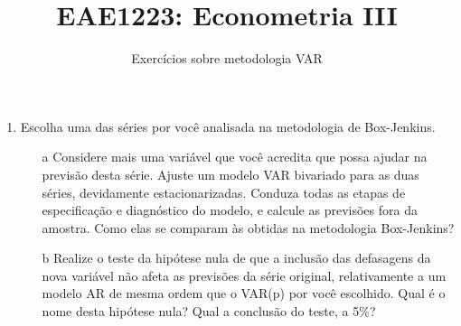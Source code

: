 \documentclass[10pt,a4paper]{article}
\title{\large EAE1223: Econometria III}
\author{\normalsize Exercícios sobre metodologia VAR}
\date{}
\begin{document}
	\maketitle
	\begin{enumerate}
\item Escolha uma das séries por você analisada na metodologia de Box-Jenkins.
\begin{itemize}
	\item[a] Considere mais uma variável que você acredita que possa ajudar na previsão desta série. Ajuste um modelo VAR bivariado para as duas séries, devidamente estacionarizadas. Conduza todas as etapas de especificação e diagnóstico do modelo, e calcule as previsões fora da amostra. Como elas se comparam às obtidas na metodologia Box-Jenkins?
	\item[b] Realize o teste da hipótese nula de que a inclusão das defasagens da nova variável não afeta as previsões da série original, relativamente a um modelo AR de mesma ordem que o VAR(p) por você escolhido. Qual é o nome desta hipótese nula? Qual a conclusão do teste, a 5\%?
\end{itemize}
\end{enumerate}
\end{document}
